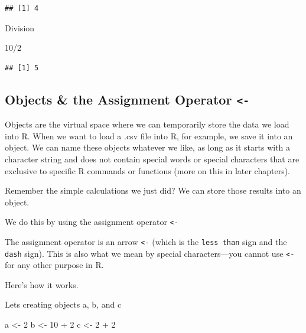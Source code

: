 \documentclass[
]{book}
\newenvironment{Shaded}{\begin{snugshade}}{\end{snugshade}}
\newcommand{\DecValTok}[1]{\textcolor[rgb]{0.00,0.00,0.81}{#1}}
\newcommand{\NormalTok}[1]{#1}
\newcommand{\OtherTok}[1]{\textcolor[rgb]{0.56,0.35,0.01}{#1}}
\newcommand{\SpecialCharTok}[1]{\textcolor[rgb]{0.00,0.00,0.00}{#1}}
\begin{document}
\begin{verbatim}
## [1] 4
\end{verbatim}

Division

\begin{Shaded}
\begin{Highlighting}[]
\DecValTok{10}\SpecialCharTok{/}\DecValTok{2}
\end{Highlighting}
\end{Shaded}

\begin{verbatim}
## [1] 5
\end{verbatim}

\hypertarget{objects-the-assignment-operator--}{%
\subsection{\texorpdfstring{Objects \& the Assignment Operator \texttt{\textless{}-}}{Objects \& the Assignment Operator \textless-}}\label{objects-the-assignment-operator--}}

Objects are the virtual space where we can temporarily store the data we load into R. When we want to load a .csv file into R, for example, we save it into an object. We can name these objects whatever we like, as long as it starts with a character string and does not contain special words or special characters that are exclusive to specific R commands or functions (more on this in later chapters).

Remember the simple calculations we just did? We can store those results into an object.

We do this by using the assignment operator \texttt{\textless{}-}

The assignment operator is an arrow \texttt{\textless{}-} (which is the \texttt{less\ than} sign and the \texttt{dash} sign). This is also what we mean by special characters---you cannot use \texttt{\textless{}-} for any other purpose in R.

Here's how it works.

Lets creating objects a, b, and c

\begin{Shaded}
\begin{Highlighting}[]
\NormalTok{a }\OtherTok{\textless{}{-}} \DecValTok{2}
\NormalTok{b }\OtherTok{\textless{}{-}} \DecValTok{10} \SpecialCharTok{+} \DecValTok{2}
\NormalTok{c }\OtherTok{\textless{}{-}} \DecValTok{2} \SpecialCharTok{+} \DecValTok{2}
\end{Highlighting}
\end{Shaded}
\end{document}
